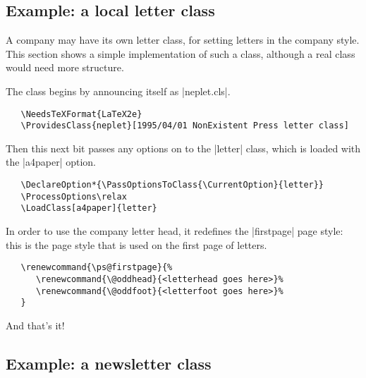\documentclass{ltxguide}[1995/11/28]
\begin{document}
\subsection{Example: a local letter class}

A company may have its own letter class, for setting letters in the
company style.  This section shows a simple implementation of such a
class, although a real class would need more structure.

The class begins by announcing itself as |neplet.cls|.
\begin{verbatim}
   \NeedsTeXFormat{LaTeX2e}
   \ProvidesClass{neplet}[1995/04/01 NonExistent Press letter class]
\end{verbatim}
Then this next bit passes any options on to the |letter| class, which
is loaded with the |a4paper| option.
\begin{verbatim}
   \DeclareOption*{\PassOptionsToClass{\CurrentOption}{letter}}
   \ProcessOptions\relax
   \LoadClass[a4paper]{letter}
\end{verbatim}
In order to use the company letter head, it redefines the
|firstpage| page style: this is the page style that is used on
the first page of letters.
\begin{verbatim}
   \renewcommand{\ps@firstpage}{%
      \renewcommand{\@oddhead}{<letterhead goes here>}%
      \renewcommand{\@oddfoot}{<letterfoot goes here>}%
   }
\end{verbatim}
And that's it!

\subsection{Example: a newsletter class}
\end{document}
